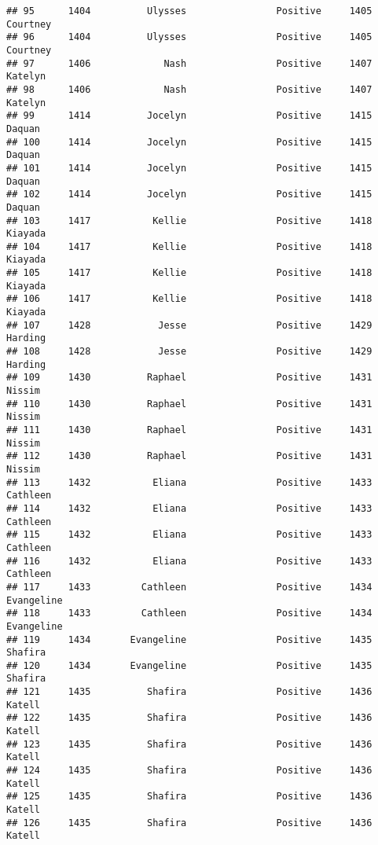 \documentclass[
]{article}
\begin{document}
\begin{verbatim}
## 95      1404          Ulysses                Positive     1405         Courtney
## 96      1404          Ulysses                Positive     1405         Courtney
## 97      1406             Nash                Positive     1407          Katelyn
## 98      1406             Nash                Positive     1407          Katelyn
## 99      1414          Jocelyn                Positive     1415           Daquan
## 100     1414          Jocelyn                Positive     1415           Daquan
## 101     1414          Jocelyn                Positive     1415           Daquan
## 102     1414          Jocelyn                Positive     1415           Daquan
## 103     1417           Kellie                Positive     1418          Kiayada
## 104     1417           Kellie                Positive     1418          Kiayada
## 105     1417           Kellie                Positive     1418          Kiayada
## 106     1417           Kellie                Positive     1418          Kiayada
## 107     1428            Jesse                Positive     1429          Harding
## 108     1428            Jesse                Positive     1429          Harding
## 109     1430          Raphael                Positive     1431           Nissim
## 110     1430          Raphael                Positive     1431           Nissim
## 111     1430          Raphael                Positive     1431           Nissim
## 112     1430          Raphael                Positive     1431           Nissim
## 113     1432           Eliana                Positive     1433         Cathleen
## 114     1432           Eliana                Positive     1433         Cathleen
## 115     1432           Eliana                Positive     1433         Cathleen
## 116     1432           Eliana                Positive     1433         Cathleen
## 117     1433         Cathleen                Positive     1434       Evangeline
## 118     1433         Cathleen                Positive     1434       Evangeline
## 119     1434       Evangeline                Positive     1435          Shafira
## 120     1434       Evangeline                Positive     1435          Shafira
## 121     1435          Shafira                Positive     1436           Katell
## 122     1435          Shafira                Positive     1436           Katell
## 123     1435          Shafira                Positive     1436           Katell
## 124     1435          Shafira                Positive     1436           Katell
## 125     1435          Shafira                Positive     1436           Katell
## 126     1435          Shafira                Positive     1436           Katell

\end{verbatim}
\end{document}
